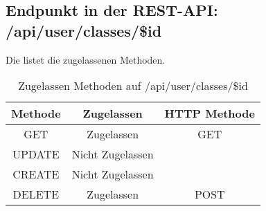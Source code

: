 \subsection{Endpunkt in der REST-API: /api/user/classes/\$id}
Die  listet die zugelassenen Methoden. 

\begin{table}[!htbp]
	\begin{tabular}{|c|c|c|}
		\hline
			\textbf{Methode} & \textbf{Zugelassen} & \textbf{HTTP Methode} \\ \hline
			GET & Zugelassen & GET \\ \hline
			UPDATE & Nicht Zugelassen & \\ \hline 
			CREATE & Nicht Zugelassen & \\ \hline 
			DELETE & Zugelassen & POST \\ \hline
	\end{tabular}

		\caption{Zugelassen Methoden auf /api/user/classes/\$id}
		\label{tab:end:rest:api:user:classes:id:meth}
\end{table}